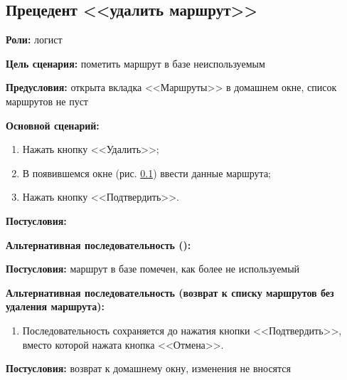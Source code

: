 \subsection{Прецедент <<удалить маршрут>>}
\textbf{Роли:} логист \par
\textbf{Цель сценария:} пометить маршрут в базе неиспользуемым \par
\textbf{Предусловия:} открыта вкладка <<Маршруты>> в домашнем окне,
    список маршрутов не пуст \par
\textbf{Основной сценарий:} 
\begin{enumerate}
    \item Нажать кнопку <<Удалить>>;
    \item В появившемся окне (рис. \ref{}) ввести данные маршрута;
    \item Нажать кнопку <<Подтвердить>>.
\end{enumerate} \par
\textbf{Постусловия:}  \par
\textbf{Альтернативная последовательность ():} \par
\begin{enumerate}
\end{enumerate} \par
\textbf{Постусловия:} маршрут в базе помечен, как более не используемый \par
\textbf{Альтернативная последовательность 
    (возврат к списку маршрутов без удаления маршрута):} \par
\begin{enumerate}
    \item Последовательность сохраняется до нажатия кнопки <<Подтвердить>>, 
        вместо которой нажата кнопка <<Отмена>>.
\end{enumerate} \par
\textbf{Постусловия:} возврат к домашнему окну, изменения не вносятся \par

